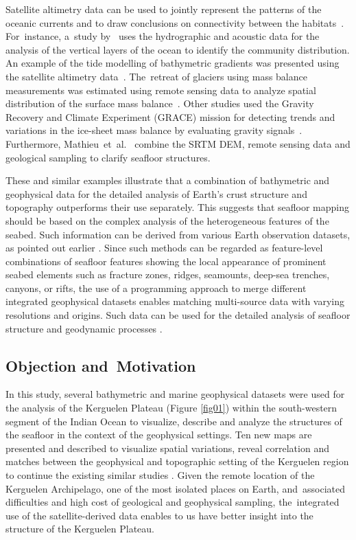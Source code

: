 \documentclass[geomatics,article,accept,pdftex,moreauthors]{Definitions/mdpi}
\begin{document}
Satellite altimetry data can be used to jointly represent the patterns of the oceanic currents and to draw conclusions on connectivity between the habitats~\cite{MORI201645}. For~instance, a~study by~\cite{COTTE2022103650} uses the hydrographic and acoustic data for the analysis of the vertical layers of the ocean to identify the community distribution. An example of the tide modelling of bathymetric gradients was presented using the satellite altimetry data~\cite{Maraldi}. The~retreat of glaciers using mass balance measurements was estimated using remote sensing data to analyze spatial distribution of the surface mass balance~\cite{Verfaillie}. Other studies used the Gravity Recovery and Climate Experiment (GRACE) mission for detecting trends and variations in the ice-sheet mass balance by evaluating gravity signals~\cite{YAMAMOTO2008267}. Furthermore, Mathieu~et~al.~\cite{MATHIEU2011206} combine the SRTM DEM, remote sensing data and geological sampling to clarify seafloor structures.

These and similar examples illustrate that a combination of bathymetric and geophysical data for the detailed analysis of Earth's crust structure and topography outperforms their use separately. This suggests that seafloor mapping should be based on the complex analysis of the heterogeneous features of the seabed. Such information can be derived from various Earth observation datasets, as pointed out earlier \cite{COWLEY2004267,Lemenkova202125,1993A234,ABUAMARAH2019868}. Since such methods can be regarded as feature-level combinations of seafloor features showing the local appearance of prominent seabed elements such as fracture zones, ridges, seamounts, deep-sea trenches, canyons, or rifts, the use of a programming approach to merge different integrated geophysical datasets enables matching multi-source data with varying resolutions and origins. Such data can be used for the detailed analysis of seafloor structure and geodynamic processes \cite{Veevers1991b,Lemenkova202104,Hill}.

\subsection{Objection and~Motivation}

In this study, several bathymetric and marine geophysical datasets were used for the analysis of the Kerguelen Plateau (Figure \ref{fig01}) within the south-western segment of the Indian Ocean to visualize, describe and analyze the structures of the seafloor in the context of the geophysical settings. Ten new maps are presented and described to visualize spatial variations, reveal correlation and matches between the geophysical and topographic setting of the Kerguelen region to continue the existing similar studies \cite{Nougier,Petit,RECQ1989133}. Given the remote location of the Kerguelen Archipelago, one of the most isolated places on Earth, and~associated difficulties and high cost of geological and geophysical sampling, the~integrated use of the satellite-derived data enables to us have better insight into the structure of the Kerguelen Plateau.
\end{document}
